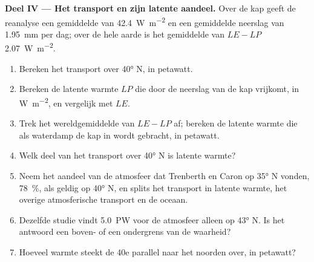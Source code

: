 \begin{problem}
\medskip
\noindent\textbf{Deel IV --- Het transport en zijn latente aandeel.} Over de kap geeft de reanalyse een gemiddelde  van \qty{42.4}{W.m^{-2}} en een gemiddelde neerslag van \qty{1.95}{mm} per dag; over de hele aarde is het gemiddelde van $LE - LP$ \qty{2.07}{W.m^{-2}}.
\begin{enumerate}[resume]
  \item Bereken het transport over \ang{40} N, in petawatt.
  \item Bereken de latente warmte $LP$ die door de neerslag van de kap vrijkomt, in \unit{W.m^{-2}}, en vergelijk met $LE$.
  \item Trek het wereldgemiddelde van $LE - LP$ af; bereken de latente warmte die als waterdamp de kap in wordt gebracht, in petawatt.
  \item Welk deel van het transport over \ang{40} N is latente warmte?
  \item Neem het aandeel van de atmosfeer dat Trenberth en Caron op \ang{35} N vonden, \qty{78}{\percent}, als geldig op \ang{40} N, en splits het transport in latente warmte, het overige atmosferische transport en de oceaan.
  \item Dezelfde studie vindt \qty{5.0}{PW} voor de atmosfeer alleen op \ang{43} N. Is het antwoord een boven- of een ondergrens van de waarheid?
  \item Hoeveel warmte steekt de 40e parallel naar het noorden over, in petawatt?
\end{enumerate}
\end{problem}
